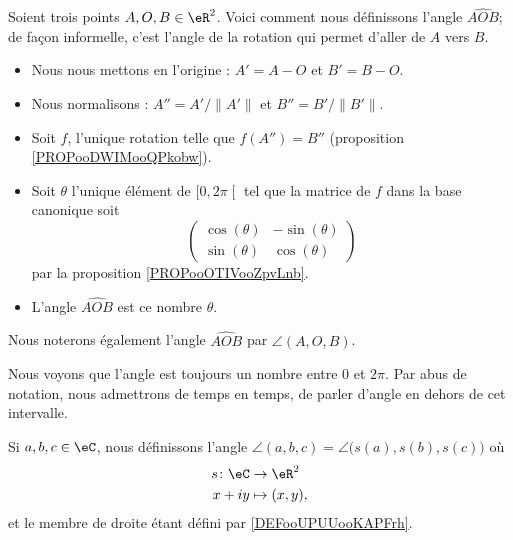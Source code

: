 \begin{definition}      \label{DEFooUPUUooKAPFrh}
	Soient trois points \( A,O,B\in \eR^2\). Voici comment nous définissons l'angle \( \widehat{AOB}\); de façon informelle, c'est l'angle de la rotation qui permet d'aller de \( A\) vers \( B\).
	\begin{itemize}
		\item Nous nous mettons en l'origine : \( A'=A-O\) et \( B'=B-O\).
		\item Nous normalisons : \( A''=A'/\| A' \|\) et \( B''=B'/\| B' \|\).
		\item Soit \( f\), l'unique rotation telle que \( f(A'')=B''\) (proposition \ref{PROPooDWIMooQPkobw}).
		\item Soit \( \theta\) l'unique élément de \( \mathopen[ 0 , 2\pi \mathclose[\) tel que la matrice de \( f\) dans la base canonique soit
		      \begin{equation}
			      \begin{pmatrix}
				      \cos(\theta) & -\sin(\theta) \\
				      \sin(\theta) & \cos(\theta)
			      \end{pmatrix}
		      \end{equation}
		      par la proposition \ref{PROPooOTIVooZpvLnb}.
		\item L'angle \( \widehat{AOB}\) est ce nombre \( \theta\).
	\end{itemize}
	Nous noterons également l'angle \( \widehat{AOB}\) par \( \angle(A,O,B)\).
\end{definition}

Nous voyons que l'angle est toujours un nombre entre \( 0\) et \( 2\pi\). Par abus de notation, nous admettrons de temps en temps, de parler d'angle en dehors de cet intervalle.

\begin{definition}     \label{DEFooMAKWooGRutOk}
	Si \( a,b,c\in \eC\), nous définissons l'angle \( \angle(a,b,c)=\angle\big( s(a), s(b),s(c) \big)\) où
	\begin{equation}
		\begin{aligned}
			s\colon \eC & \to \eR^2      \\
			x+iy        & \mapsto (x,y),
		\end{aligned}
	\end{equation}
	et le membre de droite étant défini par \ref{DEFooUPUUooKAPFrh}.
\end{definition}


